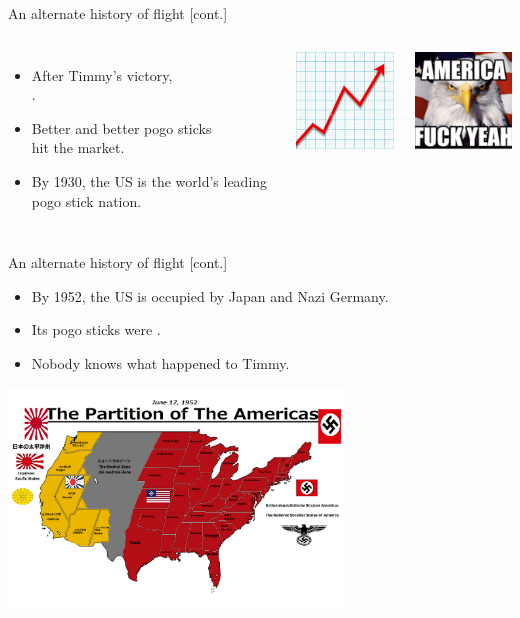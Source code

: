 \documentclass[xcolor={usenames,svgnames,x11names,dvipsnames,table}]{beamer}
\begin{document}
\begin{frame}{An alternate history of flight [cont.]}
    \begin{columns}
        \begin{itemize}
            \item After Timmy's victory,\\
                  .
            \item Better and better pogo sticks\\
                  hit the market.
            \item By 1930, the US is the world's leading pogo stick nation.
        \end{itemize}
        \includegraphics[width=10em]{./img/rising}

        \medskip
        \includegraphics[width=10em]{./img/fuckyeah}
    \end{columns}
\end{frame}

\begin{frame}{An alternate history of flight [cont.]}
    \begin{itemize}
        \item By 1952, the US is occupied by Japan and Nazi Germany. 
        \item Its pogo sticks were .
        \item Nobody knows what happened to Timmy.
    \end{itemize}

    \begin{center}
    \includegraphics[width=24em]{./img/occupied_us}
    \end{center}
\end{frame}
\end{document}
